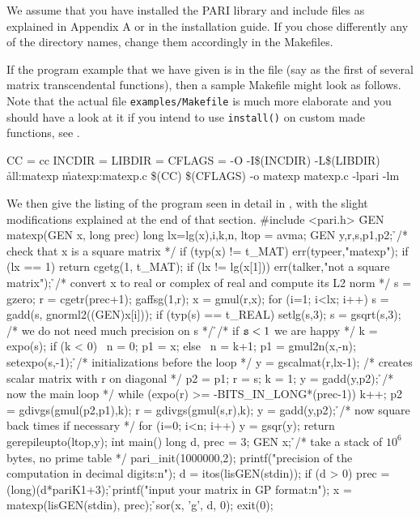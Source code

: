 
We assume that you have installed the PARI library and include files as
explained in Appendix A or in the installation guide. If you chose
differently any of the directory names, change them accordingly in the
Makefiles.

If the program example that we have given is in the file  (say
as the first of several matrix transcendental functions), then a sample
Makefile might look as follows. Note that the actual file
{\tt examples/Makefile} is much more elaborate and you should have a look at
it if you intend to use {\tt install()} on custom made functions, see
.

\bprog
CC = cc
INCDIR = 
LIBDIR = \libdir
CFLAGS = -O -I\$(INCDIR) -L\$(LIBDIR)
\h
all:\qquad matexp
\h
matexp:\qquad	matexp.c
\q\q \$(CC) \$(CFLAGS) -o matexp matexp.c -lpari -lm
\eprog

\noindent We then give the listing of the program 
seen in detail in , with the slight modifications explained
at the end of that section.
%
\bprog
\#include <pari.h>
\h
GEN
matexp(GEN x, long prec)
\obr
\q  long lx=lg(x),i,k,n, ltop = avma;
\q  GEN y,r,s,p1,p2;
\h
\q /* {\rm check that x is a square matrix} */
\q if (typ(x) != t\_MAT) err(typeer,"matexp");
\q if (lx == 1) return cgetg(1, t\_MAT);
\q if (lx != lg(x[1])) err(talker,"not a square matrix");
\h
\q /* {\rm convert x to real or complex of real and compute its L2 norm} */
\q s = gzero; r = cgetr(prec+1); gaffsg(1,r); x = gmul(r,x);
\q for (i=1; i<lx; i++)
\q\q s = gadd(s, gnorml2((GEN)x[i]));
\q if (typ(s) == t\_REAL) setlg(s,3);
\q s = gsqrt(s,3); /* {\rm we do not need much precision on s} */
\h
\q /* {\rm if ${\tt s}<1$ we are happy} */
\q k = expo(s);
\q if (k < 0) \obr\ n = 0; p1 = x; \cbr
\q else \obr\ n = k+1; p1 = gmul2n(x,-n); setexpo(s,-1); \cbr
\h
\q /* {\rm initializations before the loop} */
\q y = gscalmat(r,lx-1); /* {\rm creates scalar matrix with r on diagonal} */
\q p2 = p1; r = s; k = 1;
\q y = gadd(y,p2);
\h
\q /* {\rm now the main loop} */
\q while (expo(r) >= -BITS\_IN\_LONG*(prec-1))
\q\obr
\q\q k++; p2 = gdivgs(gmul(p2,p1),k);
\q\q r = gdivgs(gmul(s,r),k); y = gadd(y,p2);
\q\cbr
\h
\q /* {\rm now square back  times if necessary} */
\q for (i=0; i<n; i++) y = gsqr(y);
\q return gerepileupto(ltop,y);
\cbr
\h
int
main()
\obr
\q long d, prec = 3;
\q GEN x;
\h
\q /* {\rm take a stack of $10^6$ bytes, no prime table} */
\q pari\_init(1000000,2);
\q printf("precision of the computation in decimal digits:\bs n");
\q d = itos(lisGEN(stdin));
\q if (d > 0) prec = (long)(d*pariK1+3);
\h
\q printf("input your matrix in GP format:\bs n");
\q x = matexp(lisGEN(stdin), prec);
\h
\q sor(x, 'g', d, 0);
\q exit(0);
\cbr
\eprog\vfill\eject
